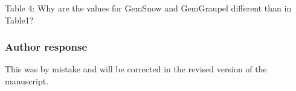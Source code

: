 \documentclass[11pt]{scrartcl}
\providecommand{\DIFadd}[1]{{\protect\textcolor{blue}{\uwave{#1}}}} %
\providecommand{\DIFaddFL}[1]{\DIFadd{#1}} %
\begin{document}
Table 4: Why are the values for GemSnow and GemGraupel different than in Table1?

\subsubsection*{Author response}

This was by mistake and will be corrected in the revised version of the
manuscript.

%
\end{document}
